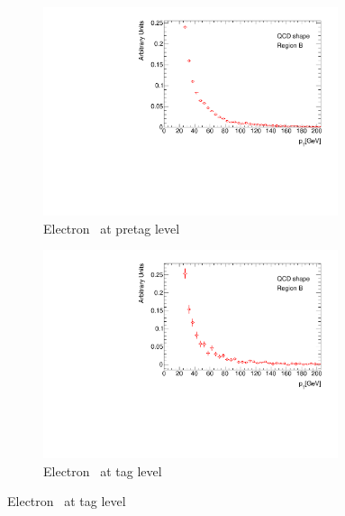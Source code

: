 \begin{figure}[htbp]
    \begin{subfigure}[b]{0.45\textwidth}
      \includegraphics[width=0.95\textwidth]{PartCrossSection/Plots/Electron/h_el_pretag_pt_wgt.pdf}
      \caption{Electron \pt\ at pretag level} \label{fig:CrossRegionBPrePt}
    \end{subfigure}
    \;
    \begin{subfigure}[b]{0.45\textwidth}
      \includegraphics[width=0.95\textwidth]{PartCrossSection/Plots/Electron/h_el_tag_pt_wgt.pdf}
      \caption{Electron \pt\ at tag level} \label{fig:CrossRegionBTagPt}
    \end{subfigure}


\end{figure}
